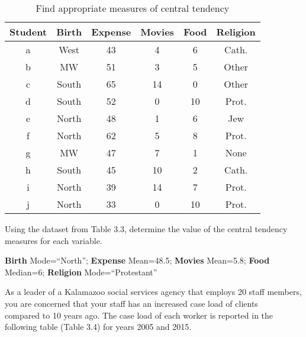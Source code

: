 \documentclass[11pt]{book}\usepackage[]{graphicx}\usepackage[]{color}
\begin{document}
\begin{exercises}
\begin{exercise}
\begin{table}[htbp]
   \centering
   \caption{Find appropriate measures of central tendency}
   {\tiny{
   \begin{tabular}{@{} cccccc  @{}} \hline %
   Student & Birth  & Expense & Movies & Food & Religion \\ \hline
   a & West  & 43 & 4 & 6 & Cath. \\
   b & MW  & 51 & 3 & 5 & Other \\
   c & South  & 65 & 14 & 0 & Other \\
   d & South  & 52 & 0 & 10 & Prot. \\
   e & North  & 48 & 1 & 6 & Jew \\
   f & North  & 62 & 5 & 8 & Prot. \\
   g & MW  & 47 & 7 & 1 & None \\
   h & South  & 45 & 10 & 2 & Cath. \\
   i & North  & 39 & 14 & 7 & Prot. \\
   j & North  & 33 & 0 & 10 & Prot. \\ \hline
   \end{tabular}
   }}
   \label{tab:t3_3a}
\end{table}

  Using the dataset from Table 3.3, determine the value of the central tendency measures for each variable.

  \end{exercise}
   \begin{solution}  %

     {\bf{Birth}} Mode=``North'';   {\bf{Expense}} Mean=48.5; {\bf{Movies}} Mean=5.8; {\bf{Food}} Median=6;  {\bf{Religion}} Mode=``Protestant''

   \end{solution}

  \begin{exercise} %

As a leader of a Kalamazoo social services agency that employs 20 staff members, you are concerned that your staff has an increased case load of clients \\ compared to 10 years ago.  The case load of each worker is reported in the following table (Table 3.4) for years 2005 and 2015.


\end{exercise}
\end{exercises}
\end{document}
